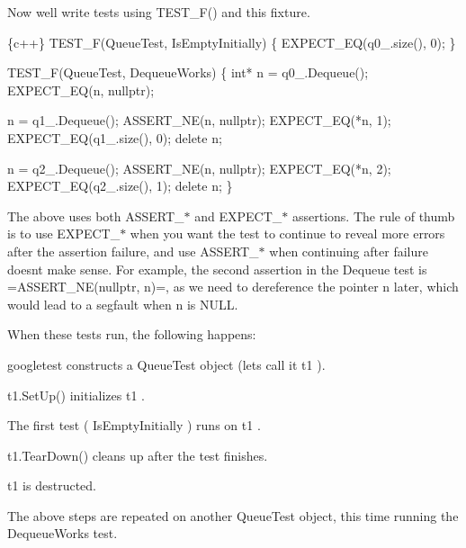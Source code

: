 Now we\textquotesingle{}ll write tests using {\ttfamily T\+E\+S\+T\+\_\+\+F()} and this fixture.


\begin{DoxyCode}
\{c++\}
TEST\_F(QueueTest, IsEmptyInitially) \{
  EXPECT\_EQ(q0\_.size(), 0);
\}

TEST\_F(QueueTest, DequeueWorks) \{
  int* n = q0\_.Dequeue();
  EXPECT\_EQ(n, nullptr);

  n = q1\_.Dequeue();
  ASSERT\_NE(n, nullptr);
  EXPECT\_EQ(*n, 1);
  EXPECT\_EQ(q1\_.size(), 0);
  delete n;

  n = q2\_.Dequeue();
  ASSERT\_NE(n, nullptr);
  EXPECT\_EQ(*n, 2);
  EXPECT\_EQ(q2\_.size(), 1);
  delete n;
\}
\end{DoxyCode}


The above uses both {\ttfamily A\+S\+S\+E\+R\+T\+\_\+$\ast$} and {\ttfamily E\+X\+P\+E\+C\+T\+\_\+$\ast$} assertions. The rule of thumb is to use {\ttfamily E\+X\+P\+E\+C\+T\+\_\+$\ast$} when you want the test to continue to reveal more errors after the assertion failure, and use {\ttfamily A\+S\+S\+E\+R\+T\+\_\+$\ast$} when continuing after failure doesn\textquotesingle{}t make sense. For example, the second assertion in the {\ttfamily Dequeue} test is =A\+S\+S\+E\+R\+T\+\_\+\+N\+E(nullptr, n)=, as we need to dereference the pointer {\ttfamily n} later, which would lead to a segfault when {\ttfamily n} is {\ttfamily N\+U\+LL}.

When these tests run, the following happens\+:


\begin{DoxyEnumerate}
\item googletest constructs a {\ttfamily Queue\+Test} object (let\textquotesingle{}s call it {\ttfamily t1} ).
\end{DoxyEnumerate}
\begin{DoxyEnumerate}
\item {\ttfamily t1.\+Set\+Up()} initializes {\ttfamily t1} .
\end{DoxyEnumerate}
\begin{DoxyEnumerate}
\item The first test ( {\ttfamily Is\+Empty\+Initially} ) runs on {\ttfamily t1} .
\end{DoxyEnumerate}
\begin{DoxyEnumerate}
\item {\ttfamily t1.\+Tear\+Down()} cleans up after the test finishes.
\end{DoxyEnumerate}
\begin{DoxyEnumerate}
\item {\ttfamily t1} is destructed.
\end{DoxyEnumerate}
\begin{DoxyEnumerate}
\item The above steps are repeated on another {\ttfamily Queue\+Test} object, this time running the {\ttfamily Dequeue\+Works} test.
\end{DoxyEnumerate}


